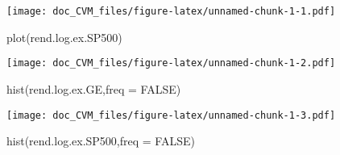\documentclass[
]{article}
\newenvironment{Shaded}{\begin{snugshade}}{\end{snugshade}}
\newcommand{\AttributeTok}[1]{\textcolor[rgb]{0.77,0.63,0.00}{#1}}
\newcommand{\CommentTok}[1]{\textcolor[rgb]{0.56,0.35,0.01}{\textit{#1}}}
\newcommand{\ConstantTok}[1]{\textcolor[rgb]{0.00,0.00,0.00}{#1}}
\newcommand{\DecValTok}[1]{\textcolor[rgb]{0.00,0.00,0.81}{#1}}
\newcommand{\FunctionTok}[1]{\textcolor[rgb]{0.00,0.00,0.00}{#1}}
\newcommand{\NormalTok}[1]{#1}
\newcommand{\OtherTok}[1]{\textcolor[rgb]{0.56,0.35,0.01}{#1}}
\newcommand{\SpecialCharTok}[1]{\textcolor[rgb]{0.00,0.00,0.00}{#1}}
\begin{document}
\begin{Shaded}
\end{Shaded}

\texttt{[image: doc\_CVM\_files/figure-latex/unnamed-chunk-1-1.pdf]}

\begin{Shaded}
\begin{Highlighting}[]
\FunctionTok{plot}\NormalTok{(rend.log.ex.SP500)}
\end{Highlighting}
\end{Shaded}

\texttt{[image: doc\_CVM\_files/figure-latex/unnamed-chunk-1-2.pdf]}

\begin{Shaded}
\begin{Highlighting}[]
\FunctionTok{hist}\NormalTok{(rend.log.ex.GE,}\AttributeTok{freq =} \ConstantTok{FALSE}\NormalTok{)}
\end{Highlighting}
\end{Shaded}

\texttt{[image: doc\_CVM\_files/figure-latex/unnamed-chunk-1-3.pdf]}

\begin{Shaded}
\begin{Highlighting}[]
\FunctionTok{hist}\NormalTok{(rend.log.ex.SP500,}\AttributeTok{freq =} \ConstantTok{FALSE}\NormalTok{)}
\end{Highlighting}
\end{Shaded}
\end{document}
